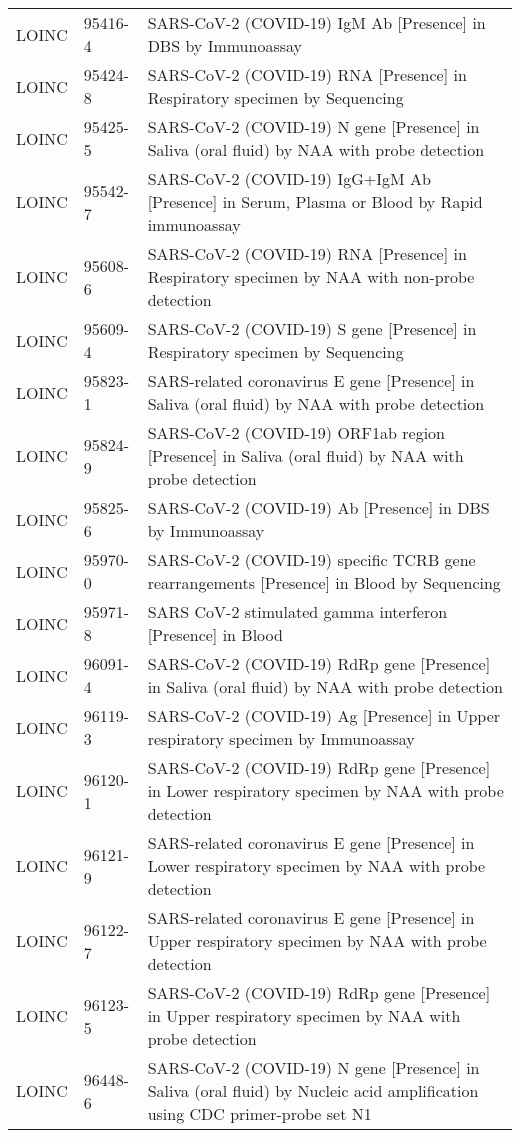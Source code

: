 \begin{table}[ht]
\begin{tabular}{lll}
  LOINC & 95416-4 & SARS-CoV-2 (COVID-19) IgM Ab [Presence] in DBS by Immunoassay \\ 
  LOINC & 95424-8 & SARS-CoV-2 (COVID-19) RNA [Presence] in Respiratory specimen by Sequencing \\ 
  LOINC & 95425-5 & SARS-CoV-2 (COVID-19) N gene [Presence] in Saliva (oral fluid) by NAA with probe detection \\ 
  LOINC & 95542-7 & SARS-CoV-2 (COVID-19) IgG+IgM Ab [Presence] in Serum, Plasma or Blood by Rapid immunoassay \\ 
  LOINC & 95608-6 & SARS-CoV-2 (COVID-19) RNA [Presence] in Respiratory specimen by NAA with non-probe detection \\ 
  LOINC & 95609-4 & SARS-CoV-2 (COVID-19) S gene [Presence] in Respiratory specimen by Sequencing \\ 
  LOINC & 95823-1 & SARS-related coronavirus E gene [Presence] in Saliva (oral fluid) by NAA with probe detection \\ 
  LOINC & 95824-9 & SARS-CoV-2 (COVID-19) ORF1ab region [Presence] in Saliva (oral fluid) by NAA with probe detection \\ 
  LOINC & 95825-6 & SARS-CoV-2 (COVID-19) Ab [Presence] in DBS by Immunoassay \\ 
  LOINC & 95970-0 & SARS-CoV-2 (COVID-19) specific TCRB gene rearrangements [Presence] in Blood by Sequencing \\ 
  LOINC & 95971-8 & SARS CoV-2 stimulated gamma interferon [Presence] in Blood \\ 
  LOINC & 96091-4 & SARS-CoV-2 (COVID-19) RdRp gene [Presence] in Saliva (oral fluid) by NAA with probe detection \\ 
  LOINC & 96119-3 & SARS-CoV-2 (COVID-19) Ag [Presence] in Upper respiratory specimen by Immunoassay \\ 
  LOINC & 96120-1 & SARS-CoV-2 (COVID-19) RdRp gene [Presence] in Lower respiratory specimen by NAA with probe detection \\ 
  LOINC & 96121-9 & SARS-related coronavirus E gene [Presence] in Lower respiratory specimen by NAA with probe detection \\ 
  LOINC & 96122-7 & SARS-related coronavirus E gene [Presence] in Upper respiratory specimen by NAA with probe detection \\ 
  LOINC & 96123-5 & SARS-CoV-2 (COVID-19) RdRp gene [Presence] in Upper respiratory specimen by NAA with probe detection \\ 
  LOINC & 96448-6 & SARS-CoV-2 (COVID-19) N gene [Presence] in Saliva (oral fluid) by Nucleic acid amplification using CDC primer-probe set N1 \\ 

\end{tabular}
\end{table}
